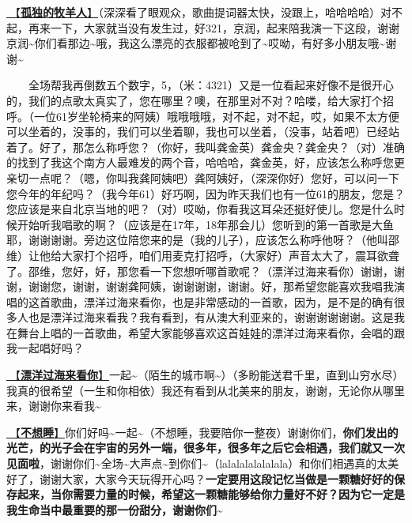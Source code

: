 \documentclass[]{ctexbook}
\begin{document}
\hyperref[lonely-shepherd]{🎵【\textbf{孤独的牧羊人}】}（深深看了眼观众，歌曲提词器太快，没跟上，哈哈哈哈）对不起，再来一下，大家就当没有发生过，好321，京润，起来陪我演一下这段，谢谢京润\textasciitilde 你们看那边\textasciitilde 哦，我这么漂亮的衣服都被呛到了\textasciitilde 哎呦，有好多小朋友哦\textasciitilde 谢谢\textasciitilde{}

  全场帮我再倒数五个数字，5，（米：4321）又是一位看起来好像不是很开心的，我们的点歌太真实了，您在哪里？噢，在那里对不对？哈喽，给大家打个招呼。（一位61岁坐轮椅来的阿姨）哦哦哦哦，对不起，对不起，哎，如果不太方便可以坐着的，没事的，我们可以坐着聊，我也可以坐着，（没事，站着吧）已经站着了。好了，那怎么称呼您？（你好，我叫龚金英）龚金央？龚金央？（对）准确的找到了我这个南方人最难发的两个音，哈哈哈，龚金英，好，应该怎么称呼您更亲切一点呢？（嗯，你叫我龚阿姨吧）龚阿姨好，（深深你好）您好，可以问一下您今年的年纪吗？（我今年61）好巧啊，因为昨天我们也有一位61的朋友，您是？您应该是来自北京当地的吧？（对）哎呦，你看我这耳朵还挺好使儿。您是什么时候开始听我唱歌的啊？（应该是在17年，18年那会儿）您听到的第一首歌是大鱼耶，谢谢谢谢。旁边这位陪您来的是（我的儿子），应该怎么称呼他呀？（他叫邵维）让他给大家打个招呼，咱们用麦克打招呼，（大家好）声音太大了，震耳欲聋了。邵维，您好，好，那您看一下您想听哪首歌呢？（漂洋过海来看你）谢谢，谢谢，谢谢您，谢谢，谢谢龚阿姨，谢谢谢谢，谢谢。好，那希望您能喜欢我唱我演唱的这首歌曲，漂洋过海来看你，也是非常感动的一首歌，因为，是不是的确有很多人也是漂洋过海来看我？我有看到，有从澳大利亚来的，谢谢谢谢谢谢。这是我在舞台上唱的一首歌曲，希望大家能够喜欢这首娃娃的漂洋过海来看你，会唱的跟我一起唱好吗？

\hyperref[across-the-ocean-to-see-you]{🎵【\textbf{漂洋过海来看你}】}一起\textasciitilde（陌生的城市啊\textasciitilde）（多盼能送君千里，直到山穷水尽）我真的很希望（一生和你相依）我还有看到从北美来的朋友，谢谢，无论你从哪里来，谢谢你来看我\textasciitilde{}

\hyperref[keep-playing]{🎵【\textbf{不想睡}】}你们好吗\textasciitilde 一起\textasciitilde（不想睡，我要陪你一整夜）谢谢你们，\textbf{你们发出的光芒，的光子会在宇宙的另外一端，很多年，很多年之后它会相遇，我们就又一次见面啦}，谢谢你们\textasciitilde 全场\textasciitilde 大声点\textasciitilde 到你们\textasciitilde（lalalalalalalala）和你们相遇真的太美好了，谢谢大家，大家今天玩得开心吗？\textbf{一定要用这段记忆当做是一颗糖好好的保存起来，当你需要力量的时候，希望这一颗糖能够给你力量好不好？因为它一定是我生命当中最重要的那一份甜分，谢谢你们\textasciitilde{}}
\end{document}
